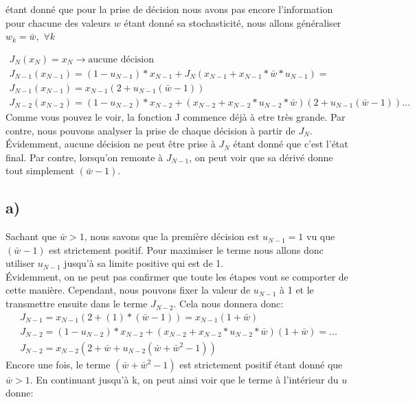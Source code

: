 \documentclass[oneside]{book}
\begin{document}
étant donné que pour la prise de décision nous avons pas encore l'information pour chacune des valeurs $w$ étant donné sa stochasticité, nous allons généraliser $w_k = \bar{w},$   $ \forall k$

\begin{align*}
J_N(x_N) = x_N \rightarrow \text{aucune décision}\\
J_{N-1}(x_{N-1}) = (1-u_{N-1})*x_{N-1} + J_N(x_{N-1} + x_{N-1}*\bar{w}*u_{N-1}) =\\
J_{N-1}(x_{N-1}) = x_{N-1}(2 + u_{N-1}(\bar{w} - 1))\\
J_{N-2}(x_{N-2}) = (1-u_{N-2})*x_{N-2} + (x_{N-2} + x_{N-2}*u_{N-2}*\bar{w})(2 + u_{N-1}(\bar{w}-1))... 
\end{align*} 
Comme vous pouvez le voir, la fonction J commence déjà à etre très grande. Par contre, nous pouvons analyser la prise de chaque décision à partir de $J_N$. Évidemment, aucune décision ne peut être prise à $J_N$ étant donné que c'est l'état final. Par contre, lorsqu'on remonte à $J_{N-1}$, on peut voir que sa dérivé donne tout simplement $(\bar{w} - 1)$.\\

\subsection*{a)}
Sachant que $\bar{w} > 1$, nous savons que la première décision est $u_{N-1} = 1$ vu que $(\bar{w} - 1)$ est strictement positif. Pour maximiser le terme nous allons donc utiliser $u_{N-1}$ jusqu'à sa limite positive qui est de 1.\\

Évidemment, on ne peut pas confirmer que toute les étapes vont se comporter de cette manière. Cependant, nous pouvons fixer la valeur de $u_{N-1}$ à 1 et le transmettre ensuite dans le terme $J_{N-2}$. Cela nous donnera donc:\\

\begin{align*}
J_{N-1} = x_{N-1}(2 + (1)*(\bar{w} - 1)) = x_{N-1}(1 + \bar{w})\\
J_{N-2} = (1 - u_{N-2})*x_{N-2} + (x_{N-2} + x_{N-2}*u_{N-2}*\bar{w})(1 + \bar{w}) = ...\\
J_{N-2} = x_{N-2}(2 + \bar{w} + u_{N-2}(\bar{w} + \bar{w}^2 - 1))
\end{align*}
Encore une fois, le terme $(\bar{w} + \bar{w}^2 - 1)$ est strictement positif étant donné que $\bar{w} > 1$. En continuant jusqu'à k, on peut ainsi voir que le terme à l'intérieur du $u$ donne:\\
\end{document}
